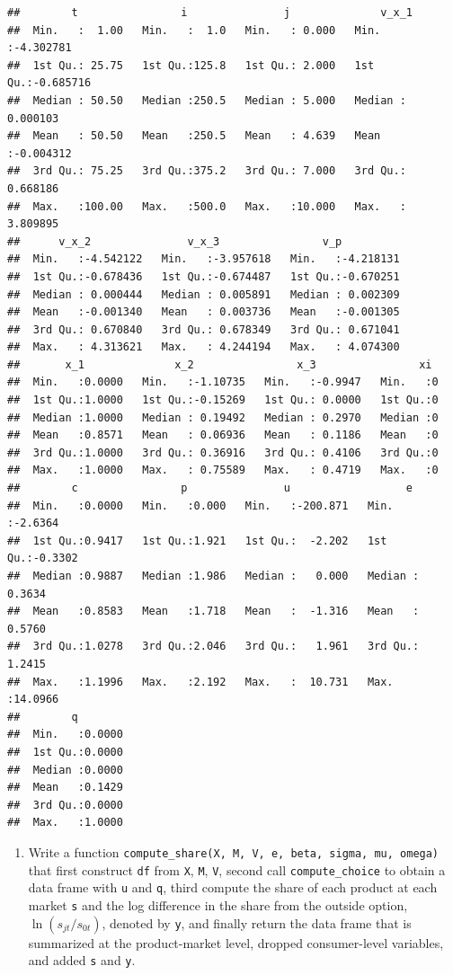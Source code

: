 \documentclass[]{book}
\providecommand{\tightlist}{%
  \setlength{\itemsep}{0pt}\setlength{\parskip}{0pt}}
\begin{document}
\begin{verbatim}
##        t                i               j              v_x_1          
##  Min.   :  1.00   Min.   :  1.0   Min.   : 0.000   Min.   :-4.302781  
##  1st Qu.: 25.75   1st Qu.:125.8   1st Qu.: 2.000   1st Qu.:-0.685716  
##  Median : 50.50   Median :250.5   Median : 5.000   Median : 0.000103  
##  Mean   : 50.50   Mean   :250.5   Mean   : 4.639   Mean   :-0.004312  
##  3rd Qu.: 75.25   3rd Qu.:375.2   3rd Qu.: 7.000   3rd Qu.: 0.668186  
##  Max.   :100.00   Max.   :500.0   Max.   :10.000   Max.   : 3.809895  
##      v_x_2               v_x_3                v_p           
##  Min.   :-4.542122   Min.   :-3.957618   Min.   :-4.218131  
##  1st Qu.:-0.678436   1st Qu.:-0.674487   1st Qu.:-0.670251  
##  Median : 0.000444   Median : 0.005891   Median : 0.002309  
##  Mean   :-0.001340   Mean   : 0.003736   Mean   :-0.001305  
##  3rd Qu.: 0.670840   3rd Qu.: 0.678349   3rd Qu.: 0.671041  
##  Max.   : 4.313621   Max.   : 4.244194   Max.   : 4.074300  
##       x_1              x_2                x_3                xi   
##  Min.   :0.0000   Min.   :-1.10735   Min.   :-0.9947   Min.   :0  
##  1st Qu.:1.0000   1st Qu.:-0.15269   1st Qu.: 0.0000   1st Qu.:0  
##  Median :1.0000   Median : 0.19492   Median : 0.2970   Median :0  
##  Mean   :0.8571   Mean   : 0.06936   Mean   : 0.1186   Mean   :0  
##  3rd Qu.:1.0000   3rd Qu.: 0.36916   3rd Qu.: 0.4106   3rd Qu.:0  
##  Max.   :1.0000   Max.   : 0.75589   Max.   : 0.4719   Max.   :0  
##        c                p               u                  e          
##  Min.   :0.0000   Min.   :0.000   Min.   :-200.871   Min.   :-2.6364  
##  1st Qu.:0.9417   1st Qu.:1.921   1st Qu.:  -2.202   1st Qu.:-0.3302  
##  Median :0.9887   Median :1.986   Median :   0.000   Median : 0.3634  
##  Mean   :0.8583   Mean   :1.718   Mean   :  -1.316   Mean   : 0.5760  
##  3rd Qu.:1.0278   3rd Qu.:2.046   3rd Qu.:   1.961   3rd Qu.: 1.2415  
##  Max.   :1.1996   Max.   :2.192   Max.   :  10.731   Max.   :14.0966  
##        q         
##  Min.   :0.0000  
##  1st Qu.:0.0000  
##  Median :0.0000  
##  Mean   :0.1429  
##  3rd Qu.:0.0000  
##  Max.   :1.0000
\end{verbatim}

\begin{enumerate}
\def\labelenumi{\arabic{enumi}.}
\setcounter{enumi}{8}
\tightlist
\item
  Write a function
  \texttt{compute\_share(X,\ M,\ V,\ e,\ beta,\ sigma,\ mu,\ omega)}
  that first construct \texttt{df} from \texttt{X}, \texttt{M},
  \texttt{V}, second call \texttt{compute\_choice} to obtain a data
  frame with \texttt{u} and \texttt{q}, third compute the share of each
  product at each market \texttt{s} and the log difference in the share
  from the outside option, \(\ln(s_{jt}/s_{0t})\), denoted by
  \texttt{y}, and finally return the data frame that is summarized at
  the product-market level, dropped consumer-level variables, and added
  \texttt{s} and \texttt{y}.
\end{enumerate}
\end{document}
